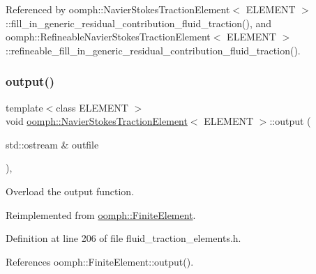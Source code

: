 Referenced by oomph\+::\+Navier\+Stokes\+Traction\+Element$<$ E\+L\+E\+M\+E\+N\+T $>$\+::fill\+\_\+in\+\_\+generic\+\_\+residual\+\_\+contribution\+\_\+fluid\+\_\+traction(), and oomph\+::\+Refineable\+Navier\+Stokes\+Traction\+Element$<$ E\+L\+E\+M\+E\+N\+T $>$\+::refineable\+\_\+fill\+\_\+in\+\_\+generic\+\_\+residual\+\_\+contribution\+\_\+fluid\+\_\+traction().

\mbox{\label{classoomph_1_1NavierStokesTractionElement_a0bbcf5b0d476a337fcfa878d2b8b3079}} 
\subsubsection{\texorpdfstring{output()}{output()}\hspace{0.1cm}{\footnotesize\ttfamily [1/2]}}
{\footnotesize\ttfamily template$<$class E\+L\+E\+M\+E\+NT $>$ \\
void \hyperlink{classoomph_1_1NavierStokesTractionElement}{oomph\+::\+Navier\+Stokes\+Traction\+Element}$<$ E\+L\+E\+M\+E\+NT $>$\+::output (\begin{DoxyParamCaption}\item[{std\+::ostream \&}]{outfile }\end{DoxyParamCaption})\hspace{0.3cm}{\ttfamily [inline]}, {\ttfamily [virtual]}}



Overload the output function. 



Reimplemented from \hyperlink{classoomph_1_1FiniteElement_a2ad98a3d2ef4999f1bef62c0ff13f2a7}{oomph\+::\+Finite\+Element}.



Definition at line 206 of file fluid\+\_\+traction\+\_\+elements.\+h.



References oomph\+::\+Finite\+Element\+::output().

\mbox{\label{classoomph_1_1NavierStokesTractionElement_aa086549476addc474e49f5f225fb5059}} 
